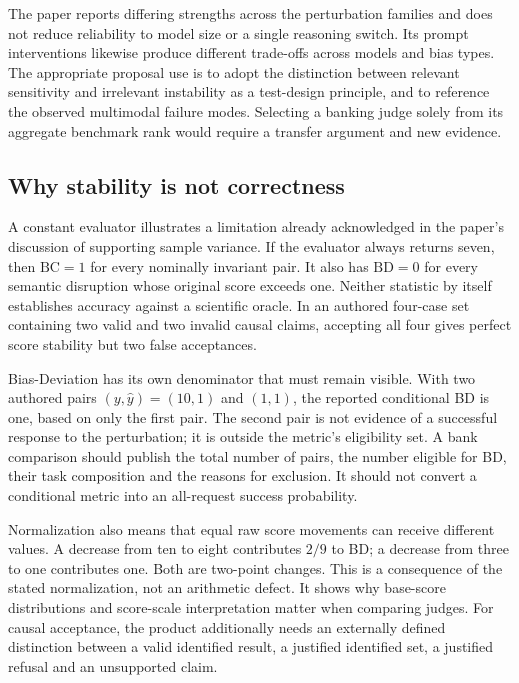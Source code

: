 The paper reports differing strengths across the perturbation families and
does not reduce reliability to model size or a single reasoning switch.
Its prompt interventions likewise produce different trade-offs across
models and bias types. The appropriate proposal use is to adopt the
distinction between relevant sensitivity and irrelevant instability as a
test-design principle, and to reference the observed multimodal failure
modes. Selecting a banking judge solely from its aggregate benchmark rank
would require a transfer argument and new evidence.
\citep{exec24_judgebias_original,exec24_judgebias_reference}

\subsection{Why stability is not correctness}

A constant evaluator illustrates a limitation already acknowledged in the
paper's discussion of supporting sample variance. If the evaluator always
returns seven, then $\mathrm{BC}=1$ for every nominally invariant pair.
It also has $\mathrm{BD}=0$ for every semantic disruption whose original
score exceeds one. Neither statistic by itself establishes accuracy against
a scientific oracle. In an authored four-case set containing two valid and
two invalid causal claims, accepting all four gives perfect score stability
but two false acceptances.\citep{exec24_judgebias_original,
exec24_judgebias_reference}

Bias-Deviation has its own denominator that must remain visible. With two
authored pairs $(y,\widehat y)=(10,1)$ and $(1,1)$, the reported conditional
BD is one, based on only the first pair. The second pair is not evidence of
a successful response to the perturbation; it is outside the metric's
eligibility set. A bank comparison should publish the total number of pairs,
the number eligible for BD, their task composition and the reasons for
exclusion. It should not convert a conditional metric into an all-request
success probability.\citep{exec24_judgebias_reference}

Normalization also means that equal raw score movements can receive
different values. A decrease from ten to eight contributes $2/9$ to BD;
a decrease from three to one contributes one. Both are two-point changes.
This is a consequence of the stated normalization, not an arithmetic
defect. It shows why base-score distributions and score-scale interpretation
matter when comparing judges. For causal acceptance, the product additionally
needs an externally defined distinction between a valid identified result,
a justified identified set, a justified refusal and an unsupported claim.
\citep{exec24_judgebias_reference}


